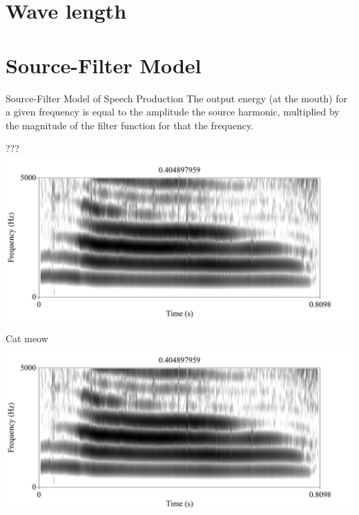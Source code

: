 \section{Wave length}

\section{Source-Filter Model}
\begin{frame}{Source-Filter Model of Speech Production}
The output energy (at the mouth) for a given frequency is equal to the amplitude the source harmonic, multiplied by the magnitude of the filter function for that the frequency.
\end{frame}

\begin{frame}{???}
\includegraphics[width=\linewidth]{02-cat-meow.png}
\end{frame}

\begin{frame}{Cat meow}
\includegraphics[width=\linewidth]{02-cat-meow.png}
\end{frame}

